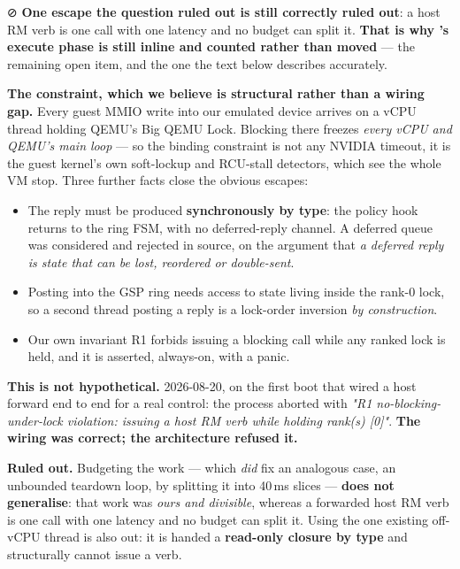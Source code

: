 \documentclass[10.5pt]{article}
\begin{document}
\begin{warnbox}
\smallskip
⊘ \textbf{One escape the question ruled out is still correctly ruled out}: a host RM verb is one
call with one latency and no budget can split it. \textbf{That is why 's execute
phase is still inline and counted rather than moved} --- the remaining open item, and the one the
text below describes accurately.
\end{warnbox}

\textbf{The constraint, which we believe is structural rather than a wiring gap.} Every guest MMIO
write into our emulated device arrives on a vCPU thread holding QEMU's Big QEMU Lock. Blocking
there freezes \emph{every vCPU and QEMU's main loop} — so the binding constraint is not any
NVIDIA timeout, it is the guest kernel's own soft-lockup and RCU-stall detectors, which see the
whole VM stop. Three further facts close the obvious escapes:
\begin{itemize}[itemsep=0.2ex]
\item The reply must be produced \textbf{synchronously by type}: the policy hook returns
   to the ring FSM, with no deferred-reply channel. A deferred queue was
  considered and rejected in source, on the argument that \emph{a deferred reply is state that can
  be lost, reordered or double-sent}.
\item Posting into the GSP ring needs  access to state living inside the rank-0 lock,
  so a second thread posting a reply is a lock-order inversion \emph{by construction}.
\item Our own invariant R1 forbids issuing a blocking call while any ranked lock is held, and it
  is asserted, always-on, with a panic.
\end{itemize}

\textbf{This is not hypothetical.} \measured{} 2026-08-20, on the first boot that wired a host
forward end to end for a real control: the process aborted with \emph{"R1
no-blocking-under-lock violation: issuing a host RM verb while holding rank(s) [0]"}.
\textbf{The wiring was correct; the architecture refused it.}

\textbf{Ruled out.} Budgeting the work — which \emph{did} fix an analogous case, an unbounded
teardown loop, by splitting it into 40\,ms slices — \textbf{does not generalise}: that work was
\emph{ours and divisible}, whereas a forwarded host RM verb is one call with one latency and no
budget can split it. Using the one existing off-vCPU thread is also out: it is handed a
\textbf{read-only closure by type} and structurally cannot issue a verb.
\end{document}
